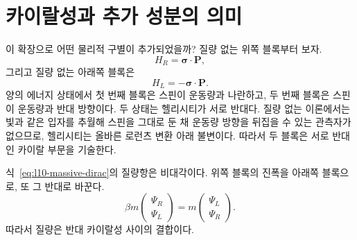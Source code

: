 \section{카이랄성과 추가 성분의 의미}

이 확장으로 어떤 물리적 구별이 추가되었을까? 질량 없는 위쪽 블록부터 보자.
\begin{equation}
H_R=\boldsymbol{\sigma}\cdot\mathbf P,
\end{equation}
그리고 질량 없는 아래쪽 블록은
\begin{equation}
H_L=-\boldsymbol{\sigma}\cdot\mathbf P.
\end{equation}
양의 에너지 상태에서 첫 번째 블록은 스핀이 운동량과 나란하고, 두 번째 블록은 스핀이 운동량과 반대 방향이다. 두 상태는 헬리시티가 서로 반대다. 질량 없는 이론에서는 빛과 같은 입자를 추월해 스핀을 그대로 둔 채 운동량 방향을 뒤집을 수 있는 관측자가 없으므로, 헬리시티는 올바른 로런츠 변환 아래 불변이다. 따라서 두 블록은 서로 반대인 카이랄 부문을 기술한다.

\begin{classroomqa}\end{classroomqa}

식~\eqref{eq:l10-massive-dirac}의 질량항은 비대각이다. 위쪽 블록의 진폭을 아래쪽 블록으로, 또 그 반대로 바꾼다.
\begin{equation}
\beta m
\begin{pmatrix}
\Psi_R\\
\Psi_L
\end{pmatrix}
=
m
\begin{pmatrix}
\Psi_L\\
\Psi_R
\end{pmatrix}.
\end{equation}
따라서 질량은 반대 카이랄성 사이의 결합이다.

\begin{classroomqa}\end{classroomqa}

